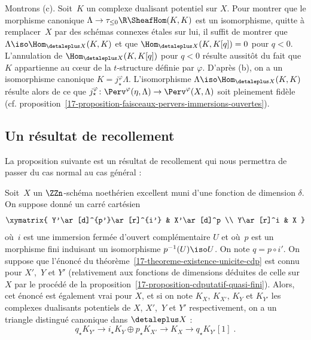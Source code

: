 \documentclass[10pt]{../fichiers-configuration-latex/smfart}
\begin{document}
Montrons (c). Soit $K$ un complexe dualisant potentiel sur $X$. Pour
montrer que le morphisme canonique $\Lambda\to\tau_{\leq
0}\R\SheafHom(K,K)$ est un isomorphisme, quitte à remplacer $X$ par
des schémas connexes étales sur lui,
il suffit de montrer que $\Lambda\iso
\Hom_{\detaleplus X}(K,K)$ et que $\Hom_{\detaleplus X}(K,K[q])=0$ pour $q<0$.
L'annulation de $\Hom_{\detaleplus X}(K,K[q])$ pour $q<0$ résulte aussitôt du
fait que $K$ appartienne au cœur de la $t$-structure définie par $\varphi$.
D'après (b), on a un isomorphisme canonique $K=j_\star^\varphi \Lambda$.
L'isomorphisme $\Lambda\iso\Hom_{\detaleplus X}(K,K)$ résulte alors de ce
que $j_\star^\varphi\colon \Perv^\varphi(\eta,\Lambda)\to
\Perv^\varphi(X,\Lambda)$ soit pleinement fidèle
(cf. proposition~\ref{17-proposition-faisceaux-pervers-immersions-ouvertes}).

\subsection{Un résultat de recollement}%
\label{17-subsection-recollement-cdp}

La proposition suivante est un résultat de recollement qui nous permettra
de passer du cas normal au cas général :

\begin{proposition2}\label{17-proposition-existence-unicite-cdp-recollement}
Soit $X$ un $\ZZn$-schéma noethérien excellent muni d'une fonction de
dimension $\delta$. On suppose donné un carré cartésien
\[
\xymatrix{
Y'\ar[d]^{p'}\ar[r]^{i'} & X'\ar[d]^p \\
Y\ar[r]^i & X }
\]
où $i$ est une immersion fermée d'ouvert complémentaire $U$
et où $p$ est un morphisme fini induisant
un isomorphisme $p^{-1}(U)\iso U$. On note $q=p\circ i'$. On suppose que
l'énoncé du théorème~\ref{17-theoreme-existence-unicite-cdp} est connu pour
$X'$, $Y$ et $Y'$ (relativement aux fonctions de dimensions déduites de
celle sur $X$ par le procédé de la
proposition~\ref{17-proposition-cdputatif-quasi-fini}). Alors, cet énoncé est
également vrai pour $X$, et si on note $K_X$, $K_{X'}$,
$K_Y$ et $K_{Y'}$ les complexes dualisants potentiels de $X$, $X'$, $Y$ et
$Y'$ respectivement, on a un triangle distingué canonique dans $\detaleplus X$
:
\[q_\star K_{Y'}\to i_\star K_Y\oplus p_\star K_{X'}\to K_X\to q_\star
K_{Y'}[1]\;\text{.}\]
\end{proposition2}
\end{document}
